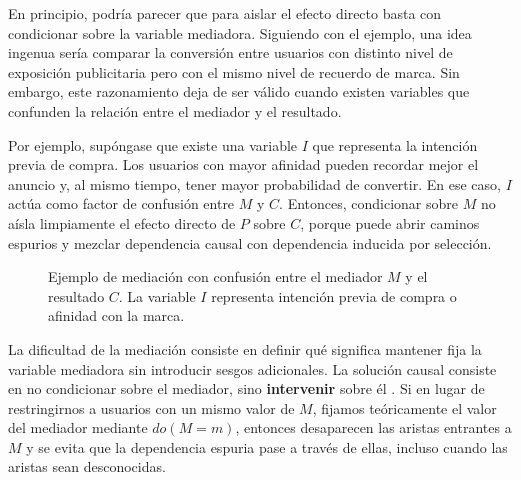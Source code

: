 \documentclass[12pt]{report} %
\begin{document}
En principio, podría parecer que para aislar el efecto directo basta con condicionar sobre la variable mediadora. Siguiendo con el ejemplo, una idea ingenua sería comparar la conversión entre usuarios con distinto nivel de exposición publicitaria pero con el mismo nivel de recuerdo de marca. Sin embargo, este razonamiento deja de ser válido cuando existen variables que confunden la relación entre el mediador y el resultado.

Por ejemplo, supóngase que existe una variable $I$ que representa la intención previa de compra. Los usuarios con mayor afinidad pueden recordar mejor el anuncio y, al mismo tiempo, tener mayor probabilidad de convertir. En ese caso, $I$ actúa como factor de confusión entre $M$ y $C$. Entonces, condicionar sobre $M$ no aísla limpiamente el efecto directo de $P$ sobre $C$, porque puede abrir caminos espurios y mezclar dependencia causal con dependencia inducida por selección.

\begin{figure}[H]
    \centering
    \begingroup
    \shorthandoff{<>}
    \endgroup
    \caption[DAG de mediación con confusión]{Ejemplo de mediación con confusión entre el mediador $M$ y el resultado $C$. La variable $I$ representa intención previa de compra o afinidad con la marca.}
    \label{fig:dag_mediacion_publicidad_confundido}
\end{figure}

La dificultad de la mediación consiste en definir qué significa mantener fija la variable mediadora sin introducir sesgos adicionales. La solución causal consiste en no condicionar sobre el mediador, sino \textbf{intervenir} sobre él \cite{Pearl2016-nx}. Si en lugar de restringirnos a usuarios con un mismo valor de $M$, fijamos teóricamente el valor del mediador mediante $do(M=m)$, entonces desaparecen las aristas entrantes a $M$ y se evita que la dependencia espuria pase a través de ellas, incluso cuando las aristas sean desconocidas.
\end{document}
